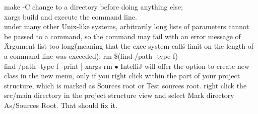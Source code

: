 make -C change to a directory before doing anything else;\\
xargs build and execute the command line.\\
under many other Unix-like systems, arbitrarily long lists of parameters cannot be passed to a command, so the command may fail with an error message of \"Argument list too long\" (meaning that the exec system call\'s limit on the length of a command line was exceeded): rm \$(find /path -type f)\\
find /path -type f -print | xargs rm
\bigskip\newline
$\bullet$   {\color{red}IntelliJ} will offer the option to create new class in the new menu, only if you right click within the part of your project structure, which is marked as Sources root or Test sources root.  right click the src/main directory in the project structure view and select Mark directory As/Sources Root. That should fix it.
